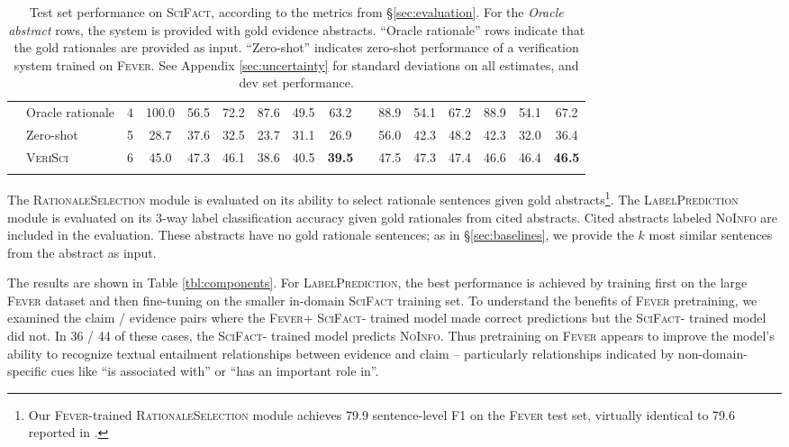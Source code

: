 \documentclass[11pt,a4paper]{article}
\newcommand{\ours}{\textsc{SciFact}\xspace}
\newcommand{\sysname}{\textsc{VeriSci}\xspace}
\newcommand{\fever}{\textsc{Fever}\xspace}
\newcommand{\notenough}{\textsc{NoInfo}\xspace}
\newcommand{\componenttwo}{\textsc{RationaleSelection}\xspace}
\newcommand{\componentthree}{\textsc{LabelPrediction}\xspace}
\newcommand{\thickmid}{\arrayrulecolor{black}\midrule}
\begin{document}
\begin{table}[t]
\begin{tabularx}{\linewidth}{*{3}{l} *{6}{c} *{1}{c} *{6}{c}}
\thickmid

\multirow{4}{*}{\textbf{Open}} &

Oracle rationale & 4 & 100.0 & 56.5 & 72.2 & 87.6 & 49.5 & 63.2 &  & 88.9 & 54.1 & 67.2 & 88.9 & 54.1 & 67.2 \\

\arrayrulecolor{black!30}\cmidrule(lr){2-16}
 & Zero-shot & 5 & 28.7 & 37.6 & 32.5 & 23.7 & 31.1 & 26.9 &  & 56.0 & 42.3 & 48.2 & 42.3 & 32.0 & 36.4 \\

 & \sysname & 6 & 45.0 & 47.3 & 46.1 & 38.6 & 40.5 & \textbf{39.5}          &  & 47.5 & 47.3 & 47.4 & 46.6 & 46.4 & \textbf{46.5}          \\


\arrayrulecolor{black}\bottomrule

  \end{tabularx}

  \caption{Test set performance on \ours, according to the metrics from \S\ref{sec:evaluation}. For the \emph{Oracle abstract} rows, the system is provided with gold evidence abstracts. ``Oracle rationale'' rows indicate that the gold rationales are provided as input. ``Zero-shot'' indicates zero-shot performance of a verification system trained on \fever. See Appendix \ref{sec:uncertainty} for standard deviations on all estimates, and dev set performance. }
    \label{tbl:main_results}

\end{table}
 
The \componenttwo module is evaluated on its ability to select rationale sentences given gold abstracts\footnote{Our \fever-trained \componenttwo module achieves 79.9 sentence-level F1 on the \fever test set, virtually identical to 79.6 reported in \cite{DeYoung2019ERASERAB}.}. The \componentthree module is evaluated on its 3-way label classification accuracy given gold rationales from cited abstracts. Cited abstracts labeled \notenough are included in the evaluation. These abstracts have no gold rationale sentences; as in \S\ref{sec:baselines}, we provide the $k$ most similar sentences from the abstract as input.

\vspace{.2cm}  The results are shown in Table \ref{tbl:components}. For \componentthree, the best performance is achieved by training first on the large \fever dataset and then fine-tuning on the smaller in-domain \ours training set. To understand the benefits of \fever pretraining, we examined the claim / evidence pairs where the \fever + \ours - trained model made correct predictions but the \ours - trained model did not. In  36 / 44 of these cases, the \ours - trained model predicts \notenough. Thus pretraining on \fever appears to improve the model's ability to recognize textual entailment relationships between evidence and claim -- particularly relationships indicated by non-domain-specific cues like ``is associated with'' or ``has an important role in''.
\end{document}

